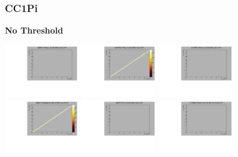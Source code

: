 \subsubsection{CC1Pi}

\textbf{No Threshold}

\begin{center}

  \includegraphics[width=0.245\textwidth]{plots/response_matrix/Proton_KE_RHC_CC1Pi_null.pdf}
  \includegraphics[width=0.245\textwidth]{plots/response_matrix/PiPlus_KE_RHC_CC1Pi_null.pdf}
  \includegraphics[width=0.245\textwidth]{plots/response_matrix/PiMinus_KE_RHC_CC1Pi_null.pdf}
  \includegraphics[width=0.245\textwidth]{plots/response_matrix/Charged_Pi_KE_RHC_CC1Pi_null.pdf}
  \includegraphics[width=0.245\textwidth]{plots/response_matrix/Pi0_KE_RHC_CC1Pi_null.pdf}
  \includegraphics[width=0.245\textwidth]{plots/response_matrix/Proton+Pion_KE_RHC_CC1Pi_null.pdf}

\end{center}
